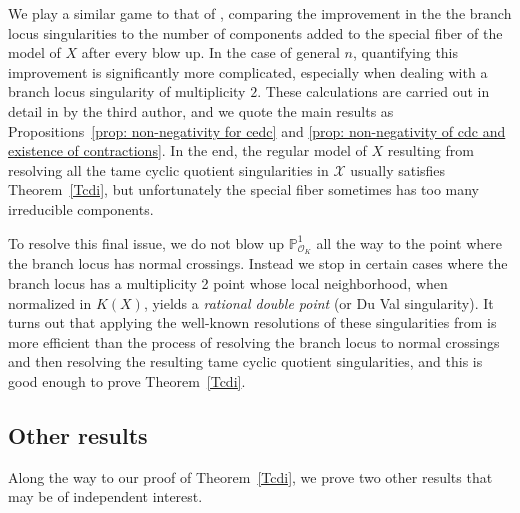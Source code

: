 \documentclass[12pt]{amsart}
\numberwithin{equation}{section}
\theoremstyle{definition}
\newcommand{\mc}[1]{\mathcal{#1}}
\newcommand{\proj}{\mathbb P}
\begin{document}
We play a similar game to that of \cite{OShyper_published}, comparing
the improvement in the the branch locus singularities to the
number of components added to the special fiber of the model of $X$ after every blow up.  In the case
of general $n$, quantifying this improvement is significantly more complicated,
especially when dealing with a branch locus singularity of
multiplicity $2$. These calculations are carried out in detail in 
\cite{Part2} by the third author, and we quote the main results as
Propositions~\ref{prop: non-negativity for cedc} and \ref{prop:
  non-negativity of cdc and existence of contractions}.  In the end, the regular model of $X$ resulting from
resolving all the tame cyclic quotient singularities in $\mc{X}$ usually satisfies Theorem~\ref{Tcdi}, but unfortunately the special fiber sometimes has too many irreducible components.

To resolve this final issue, we do not blow up
$\proj^1_{\mc{O}_K}$ all the way to the point where the branch locus
has normal crossings. Instead we stop in certain cases where the branch locus has a
multiplicity 2 point whose local neighborhood, when normalized in
$K(X)$, yields a \emph{rational double point} (or Du Val
singularity).  It turns out that applying the well-known resolutions of these
singularities from \cite{Lip69} is more efficient than the
process of resolving the branch locus to normal crossings and then
resolving the resulting tame cyclic quotient singularities, and this is good
enough to prove Theorem~\ref{Tcdi}.

\subsection{Other results}\label{Sindependent}

Along the way to our proof of Theorem~\ref{Tcdi}, we prove two other
results that may be of independent interest.
\end{document}
